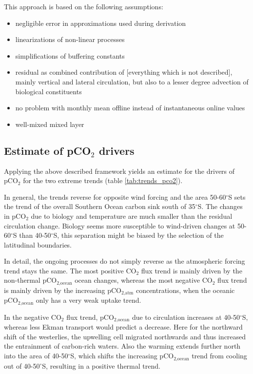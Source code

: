 \documentclass[12pt]{article}
\begin{document}
This approach is based on the following assumptions:
\begin{itemize}
\item negligible error in approximations used during derivation
\item linearizations of non-linear processes
\item simplifications of buffering constants \citep{Sarmiento2006}
\item residual as combined contribution of [everything which is not described], mainly vertical and lateral circulation, but also to a lesser degree advection of biological constituents
\item no problem with monthly mean offline instead of instantaneous online values
\item well-mixed mixed layer
\end{itemize}

\clearpage
\subsection{Estimate of pCO$_2$ drivers}


Applying the above described framework yields an estimate for the drivers of pCO$_2$ for the two extreme trends (table \ref{tab:trends_pco2}).

In general, the trends reverse for opposite wind forcing and the area 50-60$^\circ$S sets the trend of the overall Southern Ocean carbon sink south of 35$^\circ$S. The changes in pCO$_2$ due to biology and temperature are much smaller than the residual circulation change. Biology seems more susceptible to wind-driven changes at 50-60$^\circ$S than 40-50$^\circ$S, this separation might be biased by the selection of the latitudinal boundaries.

In detail, the ongoing processes do not simply reverse as the atmospheric forcing trend stays the same. 
The most positive CO$_2$ flux trend is mainly driven by the non-thermal pCO$_{\text{2,ocean}}$ ocean changes, whereas the most negative CO$_2$ flux trend is mainly driven by the increasing pCO$_{\text{2,atm}}$ concentrations, when the oceanic pCO$_{\text{2,ocean}}$ only has a very weak uptake trend.

In the negative CO$_2$ flux trend, pCO$_{\text{2,ocean}}$ due to circulation increases at 40-50$^\circ$S, whereas less Ekman transport would predict a decrease. Here for the northward shift of the westerlies, the upwelling cell migrated northwards and thus increased the entrainment of carbon-rich waters. Also the warming extends further north into the area of 40-50$^\circ$S, which shifts the increasing pCO$_{\text{2,ocean}}$ trend from cooling out of 40-50$^\circ$S, resulting in a positive thermal trend.
\end{document}
